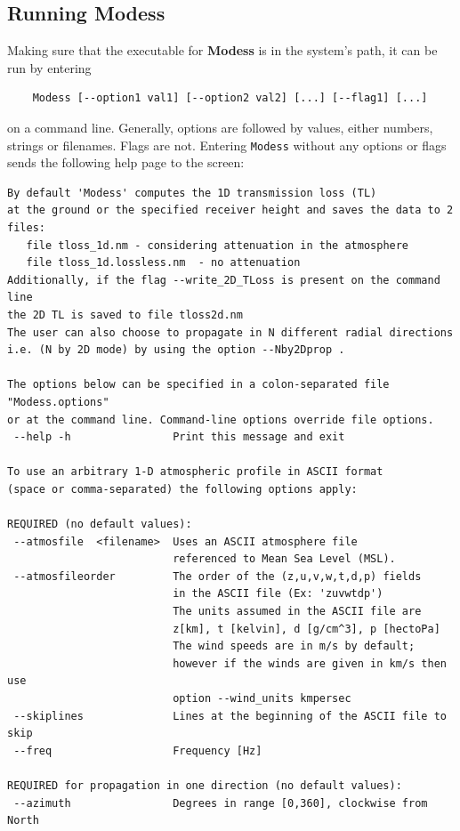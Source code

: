 \subsection{Running Modess}
\label{sec:running modess}

Making sure that the executable for {\bf Modess} is in the system's path, it can be run by entering 
\begin{verbatim} 
    Modess [--option1 val1] [--option2 val2] [...] [--flag1] [...] 
\end{verbatim}
on a command line. Generally, options are followed by values, either numbers, strings or filenames. Flags are not. Entering \verb"Modess" without any options or flags sends the following help page to the screen: 

\begin{verbatim}
By default 'Modess' computes the 1D transmission loss (TL)
at the ground or the specified receiver height and saves the data to 2 files:
   file tloss_1d.nm - considering attenuation in the atmosphere
   file tloss_1d.lossless.nm  - no attenuation
Additionally, if the flag --write_2D_TLoss is present on the command line
the 2D TL is saved to file tloss2d.nm
The user can also choose to propagate in N different radial directions
i.e. (N by 2D mode) by using the option --Nby2Dprop .

The options below can be specified in a colon-separated file "Modess.options"
or at the command line. Command-line options override file options.
 --help -h                Print this message and exit

To use an arbitrary 1-D atmospheric profile in ASCII format
(space or comma-separated) the following options apply:

REQUIRED (no default values):
 --atmosfile  <filename>  Uses an ASCII atmosphere file
                          referenced to Mean Sea Level (MSL).
 --atmosfileorder         The order of the (z,u,v,w,t,d,p) fields
                          in the ASCII file (Ex: 'zuvwtdp')
                          The units assumed in the ASCII file are
                          z[km], t [kelvin], d [g/cm^3], p [hectoPa]
                          The wind speeds are in m/s by default;
                          however if the winds are given in km/s then use
                          option --wind_units kmpersec
 --skiplines              Lines at the beginning of the ASCII file to skip
 --freq                   Frequency [Hz]

REQUIRED for propagation in one direction (no default values):
 --azimuth                Degrees in range [0,360], clockwise from North


\end{verbatim}
